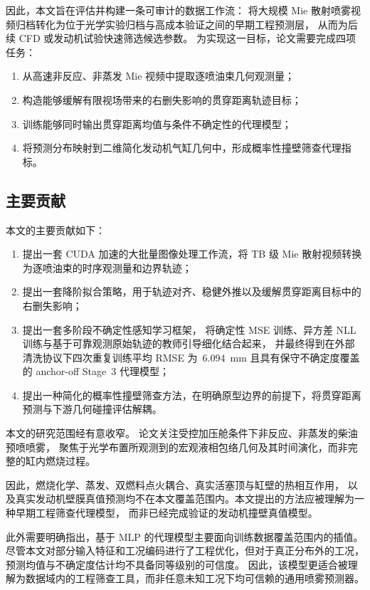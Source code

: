 因此，本文旨在评估并构建一条可审计的数据工作流：
将大规模 Mie 散射喷雾视频归档转化为位于光学实验归档与高成本验证之间的早期工程预测层，
从而为后续 CFD 或发动机试验快速筛选候选参数。
为实现这一目标，论文需要完成四项任务：
\begin{enumerate}
  \item 从高速非反应、非蒸发 Mie 视频中提取逐喷油束几何观测量；
  \item 构造能够缓解有限视场带来的右删失影响的贯穿距离轨迹目标；
  \item 训练能够同时输出贯穿距离均值与条件不确定性的代理模型；
  \item 将预测分布映射到二维简化发动机气缸几何中，形成概率性撞壁筛查代理指标。
\end{enumerate}

\subsection{主要贡献}

本文的主要贡献如下：
\begin{enumerate}
  \item 提出一套 CUDA 加速的大批量图像处理工作流，将 TB 级 Mie 散射视频转换为逐喷油束的时序观测量和边界轨迹；
  \item 提出一套降阶拟合策略，用于轨迹对齐、稳健外推以及缓解贯穿距离目标中的右删失影响；
  \item 提出一套多阶段不确定性感知学习框架，
  将确定性 MSE 训练、异方差 NLL 训练与基于可靠观测原始轨迹的教师引导细化结合起来，
  并最终得到在外部清洗协议下四次重复训练平均 RMSE 为~\SI{6.094}{mm} 且具有保守不确定度覆盖的 anchor-off Stage~3 代理模型；
  \item 提出一种简化的概率性撞壁筛查方法，在明确原型边界的前提下，将贯穿距离预测与下游几何碰撞评估解耦。
\end{enumerate}

本文的研究范围经有意收窄。
论文关注受控加压舱条件下非反应、非蒸发的柴油预喷喷雾，
聚焦于光学布置所观测到的宏观液相包络几何及其时间演化，而非完整的缸内燃烧过程。

因此，燃烧化学、蒸发、双燃料点火耦合、真实活塞顶与缸壁的热相互作用，
以及真实发动机壁膜真值预测均不在本文覆盖范围内。本文提出的方法应被理解为一种早期工程筛查代理模型，
而非已经完成验证的发动机撞壁真值模型。

此外需要明确指出，基于 MLP 的代理模型主要面向训练数据覆盖范围内的插值。
尽管本文对部分输入特征和工况编码进行了工程优化，但对于真正分布外的工况，预测均值与不确定度估计均不具备同等级别的可信度。
因此，该模型更适合被理解为数据域内的工程筛查工具，而非任意未知工况下均可信赖的通用喷雾预测器。

